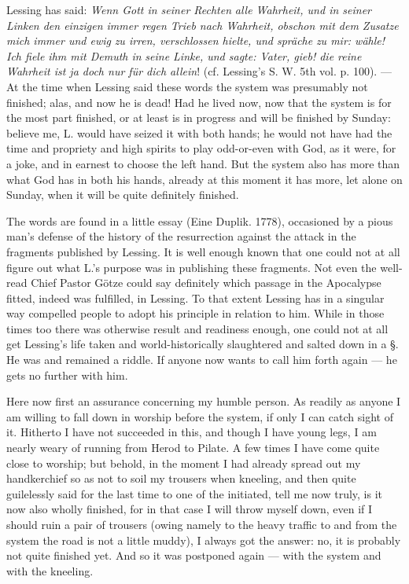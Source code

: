 \documentclass[12pt,a4paper,openany]{book}
\newcommand{\opage}[1]{\marginnote{\footnotesize\textit{[#1]}}}
\begin{document}
Lessing has said: \emph{Wenn Gott in seiner Rechten}
\emph{alle Wahrheit, und in seiner Linken den einzigen
immer regen Trieb nach Wahrheit, obschon
mit dem Zusatze mich immer und ewig}
\setcounter{footnote}{0}%
\opage{168}\emph{zu irren, verschlossen hielte, und spräche}
\emph{zu mir: wähle! Ich fiele ihm mit Demuth in}
\emph{seine Linke, und sagte: Vater, gieb! die reine
Wahrheit ist ja doch nur für dich allein}!
(cf. Lessing's S. W. 5th vol. p. 100). --- At the time when Lessing said these words
the system was presumably not finished; alas, and now he is dead! Had he lived now,
now that the system is for the most part finished, or at least is in progress and will
be finished by Sunday: believe me, L. would have seized it with both hands; he would
not have had the time and propriety and high spirits to play odd-or-even with God,
as it were, for a joke, and in earnest to choose the left hand. But the system also
has more than what God has in both his hands, already at this moment it has more,
let alone on Sunday, when it will be quite definitely finished.

The words are found in a little essay (Eine Duplik. 1778), occasioned by a pious
man's defense of the history of the resurrection against the attack in the fragments
published by Lessing. It is well enough known that one could not at all figure out
what L.'s purpose was in publishing these fragments. Not even the well-read Chief
Pastor Götze could say definitely which passage in the Apocalypse fitted, indeed
was fulfilled, in Lessing. To that extent Lessing has in a singular way compelled
people to adopt his principle in relation to him. While in those times too there was
otherwise result and readiness enough, one could not at all get Lessing's life taken
and world-historically slaughtered and salted down in a §. He was and remained a
riddle. If anyone now wants to call him forth again --- he gets no further with him.

Here now first an assurance concerning my humble person. As readily as anyone I am
willing to fall down in worship before the system, if only I can catch sight of it.
Hitherto I have not succeeded in this, and though I have young legs, I am nearly
weary of running from Herod to Pilate. A few times I have come quite close to
worship; but behold, in the
\setcounter{footnote}{0}%
\opage{169}moment I had already spread out my handkerchief so as not to soil my trousers
when kneeling, and then quite guilelessly said for the last time to one of the
initiated, tell me now truly, is it now also wholly finished, for in that case I
will throw myself down, even if I should ruin a pair of trousers (owing namely to
the heavy traffic to and from the system the road is not a little muddy), I always
got the answer: no, it is probably not quite finished yet. And so it was
postponed again --- with the system and with the kneeling.
\end{document}
